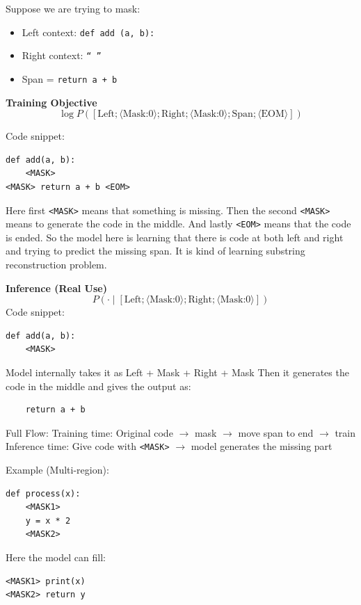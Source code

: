 \documentclass[12pt]{article}
\begin{document}
Suppose we are trying to mask:
\begin{itemize}
\item Left context: \texttt{def add (a, b):}
\item Right context: \texttt{`` ''}
\item Span = \texttt{return a + b}
\end{itemize}

\noindent\textbf{Training Objective~\cite{fried2023incodergenerativemodelcode}}
\begin{equation}
\log P\left([
\text{Left};\langle \text{Mask:0} \rangle;
\text{Right};\langle \text{Mask:0} \rangle;
\text{Span};\langle \text{EOM} \rangle
]\right)
\end{equation}

Code snippet:
\begin{lstlisting}
def add(a, b):
	<MASK>
<MASK> return a + b <EOM>
\end{lstlisting}
Here first \verb|<MASK>| means that something is missing. Then the second \verb|<MASK>| means to generate the code in the middle. And lastly \verb|<EOM>| means that the code is ended. So the model here is learning that there is code at both left and right and trying to predict the missing span. It is kind of learning substring reconstruction problem.

\noindent\textbf{Inference (Real Use)~\cite{fried2023incodergenerativemodelcode}}
\begin{equation}
P\left(\cdot \mid [
\text{Left};\langle \text{Mask:0} \rangle;
\text{Right};\langle \text{Mask:0} \rangle
]\right)
\end{equation}
Code snippet:
\begin{lstlisting}
def add(a, b):
	<MASK>
\end{lstlisting}
Model internally takes it as Left + Mask + Right + Mask
Then it generates the code in the middle and gives the output as:
\begin{lstlisting}
	return a + b	
\end{lstlisting}
Full Flow:
Training time:
Original code $\rightarrow$ mask $\rightarrow$ move span to end $\rightarrow$ train
Inference time:
Give code with \verb|<MASK>| $\rightarrow$ model generates the missing part

Example (Multi-region):
\begin{lstlisting}
def process(x):
	<MASK1>
	y = x * 2
	<MASK2>
\end{lstlisting}
Here the model can fill:
\begin{lstlisting}
<MASK1> print(x)
<MASK2> return y
\end{lstlisting}
\end{document}
